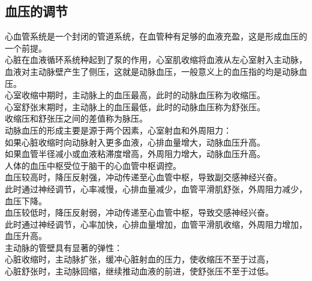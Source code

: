 \documentclass[UTF8]{ctexart}
\begin{document}
\newpage

\subsection{血压的调节}
    心血管系统是一个封闭的管道系统，在血管种有足够的血液充盈，这是形成血压的一个前提。\\[3mm]
    心脏在血液循环系统种起到了泵的作用，心室肌收缩将血液从左心室射入主动脉，
    血液对主动脉壁产生了侧压，这就是动脉血压，一般意义上的血压指的均是动脉血压。\\[3mm]
    心室收缩中期时，主动脉上的血压最高，此时的动脉血压称为收缩压。\\[3mm]
    心室舒张末期时，主动脉上的血压最低，此时的动脉血压称为舒张压。\\[3mm]
    收缩压和舒张压之间的差值称为脉压。\\[6mm]
    动脉血压的形成主要是源于两个因素，心室射血和外周阻力：\\[3mm]
    如果心脏收缩时向动脉射入更多血液，心排血量增大，动脉血压升高。\\[3mm]
    如果血管半径减小或血液粘滞度增高，外周阻力增大，动脉血压升高。\\[6mm]
    人体的血压中枢受位于脑干的心血管中枢调控。\\[3mm]
    血压较高时，降压反射强，冲动传递至心血管中枢，导致副交感神经兴奋。\\[3mm]
    此时通过神经调节，心率减慢，心排血量减少，血管平滑肌舒张，外周阻力减少，血压下降。\\[3mm]
    血压较低时，降压反射弱，冲动传递至心血管中枢，导致交感神经兴奋。\\[3mm]
    此时通过神经调节，心率加快，心排血量增加，血管平滑肌收缩，外周阻力增加，血压升高。\\[6mm]
    主动脉的管壁具有显著的弹性：\\[3mm]
    心脏收缩时，主动脉扩张，缓冲心脏射血的压力，使收缩压不至于过高，\\[3mm]
    心脏舒张时，主动脉回缩，继续推动血液的前进，使舒张压不至于过低。

\newpage
\end{document}
